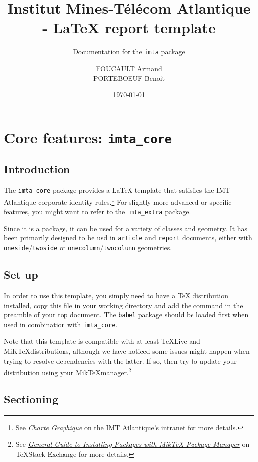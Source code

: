 \documentclass{report}
\author{FOUCAULT Armand\\PORTEBOEUF Benoît}
\date{\noexpand\today}
\title{Institut Mines-Télécom Atlantique - \LaTeX{} report template}
\subtitle{Documentation for the \texttt{imta} package}
\begin{document}
	
\imtaMaketitlepage

\tableofcontents

\newpage




\chapter{Core features: \texttt{imta\_core}}


\section{Introduction}
The \texttt{imta\_core} package provides a \LaTeX{} template that satisfies the IMT Atlantique corporate identity rules.\footnote{See \textit{\href{https://intranet.imt-atlantique.fr/wp-content/uploads/2017/01/imt_atlantique_chartegraphique.pdf}{Charte Graphique}} on the IMT Atlantique's intranet for more details.} For slightly more advanced or specific features, you might want to refer to the \texttt{imta\_extra} package.

Since it is a package, it can be used for a variety of classes and geometry. It has been primarily designed to be usd in \texttt{article} and \texttt{report} documents, either with \texttt{oneside}/\texttt{twoside} or \texttt{onecolumn}/\texttt{twocolumn} geometries.


\section{Set up}
In order to use this template, you simply need to have a \TeX{} distribution installed, copy this file in your working directory and add the  command in the preamble of your top document. The \texttt{babel} package should be loaded first when used in combination with \texttt{imta\_core}.

Note that this template is compatible with at least \TeX Live and MiK\TeX distributions, although we have noticed some issues might happen when trying to resolve dependencies with the latter. If so, then try to update your distribution using your Mik\TeX manager.\footnote{See \textit{\href{https://tex.stackexchange.com/a/359851}{General Guide to Installing Packages with MikTeX Package Manager}} on \TeX Stack Exchange for more details.}


\section{Sectioning}
\end{document}
